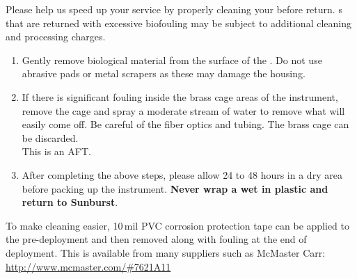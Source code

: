 \begin{minipage}[t]{0.5\textwidth}
Please help us speed up your service by properly cleaning your \instType{} before return.  \instType{}s that are returned with excessive biofouling may be subject to additional cleaning and processing charges.\\

\begin{enumerate}
\item Gently remove biological material from the surface of the \instType{}.  Do not use abrasive pads or metal scrapers as these may damage the housing.\\


\ifcase \inst
\or
	\item If there is significant fouling inside the brass cage areas of the instrument, remove the cage and spray a moderate stream of water to remove what will easily come off.  Be careful of the fiber optics and tubing.  The brass cage can be discarded.\\
\or
	This is an AFT.
\fi

\item After completing the above steps, please allow 24 to 48 hours in a dry area before packing up the instrument. \textbf{Never wrap a wet \instType{} in plastic and return to Sunburst}.
\end{enumerate}

\ifiSAMI
    \vspace*{6.5cm}
\else
    \vspace*{4cm}
\fi

\noindent
To make cleaning easier, 10\,mil PVC corrosion protection tape can be applied to the \instType{} pre-deployment and then removed along with fouling at the end of deployment. This is available from many suppliers such as McMaster Carr:
\newline
\url{http://www.mcmaster.com/#7621A11}
\end{minipage}


\newpage
\restoregeometry

